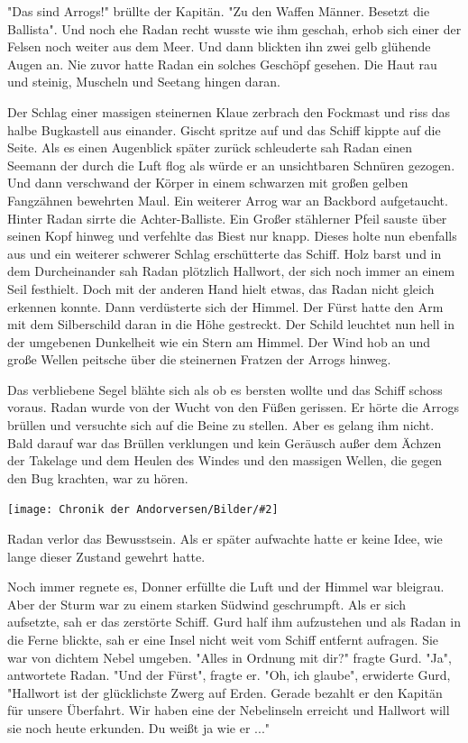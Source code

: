 \documentclass[10pt, a4paper, oneside]{book}
\newcommand{\bildmitts}[2][height=0.32\textwidth,width=0.48\textwidth,keepaspectratio]{%
    \begin{center}
        \texttt{[image: Chronik der Andorversen/Bilder/\#2]}
    \end{center}
}
\begin{document}
\begin{multicols}{2}
"Das sind Arrogs!" brüllte der Kapitän. "Zu den Waffen Männer. Besetzt die Ballista". Und noch ehe Radan recht wusste wie ihm geschah, erhob sich einer der Felsen noch weiter aus dem Meer. Und dann blickten  ihn zwei gelb glühende Augen an. Nie zuvor hatte Radan ein solches Geschöpf gesehen. Die Haut rau und steinig, Muscheln und Seetang hingen daran.\bigskip

Der Schlag einer massigen steinernen Klaue zerbrach den Fockmast und riss das halbe Bugkastell aus einander. Gischt spritze auf und das Schiff kippte auf die Seite. Als es einen Augenblick später zurück schleuderte sah Radan einen Seemann der durch die Luft flog als würde er an unsichtbaren Schnüren gezogen. Und dann verschwand der Körper in einem schwarzen mit großen gelben Fangzähnen bewehrten Maul. Ein weiterer Arrog war an Backbord aufgetaucht. Hinter Radan sirrte die Achter-Balliste. Ein Großer stählerner Pfeil sauste über seinen Kopf hinweg und verfehlte das Biest nur knapp. Dieses holte nun ebenfalls aus und ein weiterer schwerer Schlag erschütterte das Schiff. Holz barst und in dem Durcheinander sah Radan plötzlich Hallwort, der sich noch immer an einem Seil festhielt. Doch mit der anderen Hand hielt etwas, das Radan nicht gleich erkennen konnte. Dann  verdüsterte sich der Himmel. Der Fürst hatte den Arm mit dem Silberschild daran in die Höhe gestreckt. Der Schild leuchtet nun hell in der umgebenen Dunkelheit wie ein Stern am Himmel. Der Wind hob an und große Wellen peitsche über die steinernen Fratzen der Arrogs hinweg.\bigskip

Das verbliebene Segel blähte sich als ob es bersten wollte und das Schiff schoss voraus. Radan wurde von der Wucht von den Füßen gerissen. Er hörte die Arrogs brüllen und versuchte sich auf die Beine zu stellen. Aber es gelang ihm nicht. Bald darauf war das Brüllen verklungen und kein Geräusch außer dem Ächzen der Takelage und dem Heulen des Windes und den massigen Wellen, die gegen den Bug krachten, war zu hören.\bigskip

\bildmitts{Der Sturmschild Bild 4.png}


Radan verlor das Bewusstsein. Als er später aufwachte hatte er keine Idee, wie lange dieser Zustand gewehrt hatte.\bigskip

Noch immer regnete es, Donner erfüllte die Luft und der Himmel war bleigrau. Aber der Sturm war zu einem starken Südwind geschrumpft. Als er sich aufsetzte, sah er das zerstörte Schiff. Gurd half ihm aufzustehen und als Radan in die Ferne blickte, sah er eine Insel nicht weit vom Schiff entfernt aufragen. Sie war von dichtem Nebel umgeben. "Alles in Ordnung mit dir?" fragte Gurd. "Ja", antwortete Radan. "Und der Fürst", fragte er. "Oh, ich glaube", erwiderte Gurd, "Hallwort ist der glücklichste Zwerg auf Erden. Gerade bezahlt er den Kapitän für unsere Überfahrt. Wir haben eine der Nebelinseln erreicht und Hallwort will sie noch heute erkunden. Du weißt ja wie er ..."\bigskip


\end{multicols}
\end{document}
